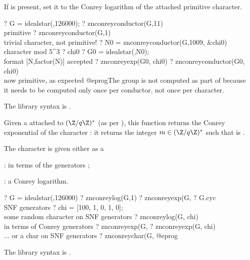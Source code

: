If  is present, set it to the Conrey logarithm of the attached
primitive character.

\bprog
? G = idealstar(,126000);
? znconreyconductor(G,11)   \\ primitive
? znconreyconductor(G,1)    \\ trivial character, not primitive!
? N0 = znconreyconductor(G,1009, &chi0) \\ character mod 5^3
? chi0
? G0 = idealstar(,N0);      \\ format [N,factor(N)] accepted
? znconreyexp(G0, chi0)
? znconreyconductor(G0, chi0) \\ now primitive, as expected
@eprog\noindent The group  is not computed as part of
 because it needs to be computed only once per
conductor, not once per character.

The library syntax is .

\label{se:znconreyexp}
Given a  attached to $(\Z/q\Z)^*$ (as per
), this function returns the Conrey exponential of
the character : it returns the integer
$m \in (\Z/q\Z)^*$ such that  is .

The character  is given either as a

\item {}: in terms of the generators ;

\item {}: a Conrey logarithm.

\bprog
? G = idealstar(,126000)
? znconreylog(G,1)
? znconreyexp(G,%
? G.cyc \\ SNF generators
? chi = [100, 1, 0, 1, 0]; \\ some random character on SNF generators
? znconreylog(G, chi)  \\ in terms of Conrey generators
? znconreyexp(G, %
? znconreyexp(G, chi) \\ ... or a char on SNF generators
? znconreychar(G,%
@eprog

The library syntax is .

